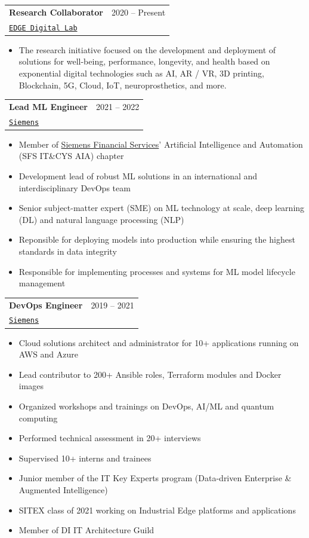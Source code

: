\documentclass[letterpaper,11pt]{article}
\makeatletter
\newcommand{\resumeSubheading}[4]{
  \vspace{-2pt}\item
    \begin{tabular*}{0.97\textwidth}[t]{l@{\extracolsep{\fill}}r}
      \textbf{#1} & #2 \\
      \texttt{\small#3} & \textit{\small #4} \\
    \end{tabular*}\vspace{-7pt}
}
\makeatother
\begin{document}
    \resumeSubheading
      {Research Collaborator}{2020 -- Present}
      {\href{https://www.linkedin.com/company/edge-digital-lab/}{EDGE Digital Lab}}{}
    \vspace{2mm}
        \begin{itemize}
            \item The research initiative focused on the development and deployment of solutions for well-being, performance, longevity, and health based on exponential digital technologies such as AI, AR / VR, 3D printing, Blockchain, 5G, Cloud, IoT, neuroprosthetics, and more.
        \end{itemize}
    \vspace{1mm}

    \resumeSubheading
      {Lead ML Engineer}{2021 -- 2022}
      {\href{https://www.siemens.com/global/en.html}{Siemens}}{}
    \vspace{2mm}
        \begin{itemize}
            \item Member of \href{https://siemens.com/finance}{Siemens Financial Services}' Artificial Intelligence and Automation (SFS IT\&CYS AIA) chapter
            \item Development lead of robust ML solutions in an international and interdisciplinary DevOps team
            \item Senior subject-matter expert (SME) on ML technology at scale, deep learning (DL) and natural language processing (NLP)
            \item Reponsible for deploying models into production while ensuring the highest standards in data integrity
            \item Responsible for implementing processes and systems for ML model lifecycle management
        \end{itemize}

    \vspace{1mm}
    \resumeSubheading
      {DevOps Engineer}{2019 -- 2021}
      {\href{https://www.siemens.com/global/en.html}{Siemens}}{}
    \vspace{2mm}
        \begin{itemize}
            \item Cloud solutions architect and administrator for 10+ applications running on AWS and Azure
            \item Lead contributor to 200+ Ansible roles, Terraform modules and Docker images
            \item Organized workshops and trainings on DevOps, AI/ML and quantum computing
            \item Performed technical assessment in 20+ interviews
            \item Supervised 10+ interns and trainees
            \item Junior member of the IT Key Experts program (Data-driven Enterprise \& Augmented Intelligence)
            \item SITEX class of 2021 working on Industrial Edge platforms and applications
            \item Member of DI IT Architecture Guild
        \end{itemize}
\end{document}
